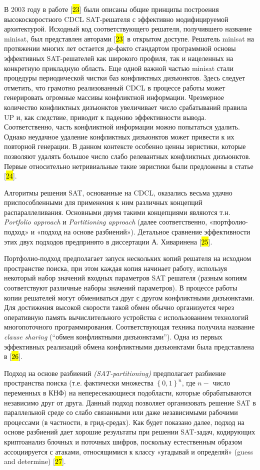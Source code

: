 В 2003 году в работе {[}\hl{23}{]} были описаны общие принципы построения высокоскоростного CDCL SAT-решателя с эффективно модифицируемой архитектурой. Исходный код соответствующего решателя, получившего название minisat, был представлен авторами {[}\hl{23}{]} в открытом доступе. Решатель minisat на протяжении многих лет остается де-факто стандартом программной основы эффективных SAT-решателей как широкого профиля, так и нацеленных на конкретную прикладную область. Еще одной важной частью minisat стали процедуры периодической чистки баз конфликтных дизъюнктов. Здесь следует отметить, что грамотно реализованный CDCL в процессе работы может генерировать огромные массивы конфликтной информации. Чрезмерное количество конфликтных дизъюнктов увеличивает число срабатываний правила UP и, как следствие, приводит к падению эффективности вывода. Соответственно, часть конфликтной информации можно попытаться удалить. Однако неудачное удаление конфликтных дизъюнктов может привести к их повторной генерации. В данном контексте особенно ценны эвристики, которые позволяют удалять большое число слабо релевантных конфликтных дизъюнктов. Первые относительно нетривиальные такие эвристики были предложены в статье {[}\hl{24}{]}.

Алгоритмы решения SAT, основанные на CDCL, оказались весьма удачно приспособленными для применения к ним различных концепций распараллеливания. Основными двумя такими концепциями являются т.н. \textit{Portfolio approach} и \textit{Partitioning approach} (далее соответственно, «портфолио-подход» и «подход на основе разбиений»). Детальное сравнение эффективности этих двух подходов предпринято в диссертации А. Хиваринена {[}\hl{25}{]}.

Портфолио-подход предполагает запуск нескольких копий решателя на исходном пространстве поиска, при этом каждая копия начинает работу, используя некоторый набор значений входных параметров SAT решателя (разным копиям соответствуют различные наборы значений параметров). В процессе работы копии решателей могут обмениваться друг с другом конфликтными дизъюнктами. Для достижения высокой скорости такой обмен обычно организуется через оперативную память вычислительного устройства с использованием технологий многопоточного программирования. Соответствующая техника получила название \textit{clause sharing} (\enquote{обмен конфликтными дизъюнктами}). Одна из первых эффективных реализаций обмена конфликтными дизъюнктами была представлена в {[}\hl{26}{]}.

Подход на основе разбиений \textit{(SAT-partitioning)} предполагает разбиение пространства поиска (т.е. фактически множества $\left\{ 0,1 \right\}^{n}$, где $n -$ число переменных в КНФ) на непересекающиеся подобласти, которые обрабатываются независимо друг от друга. Данный подход позволяет организовать решение SAT в параллельной среде со слабо связанными или даже независимыми рабочими процессами (в частности, в грид-средах). Как будет показано далее, подход на основе разбиений дает хорошие результаты при решении SAT-задач, кодирующих криптоанализ блочных и поточных шифров, поскольку естественным образом ассоциируется с атаками, относящимися к классу «угадывай и определяй» (guess and determine) {[}\hl{27}{]}.

